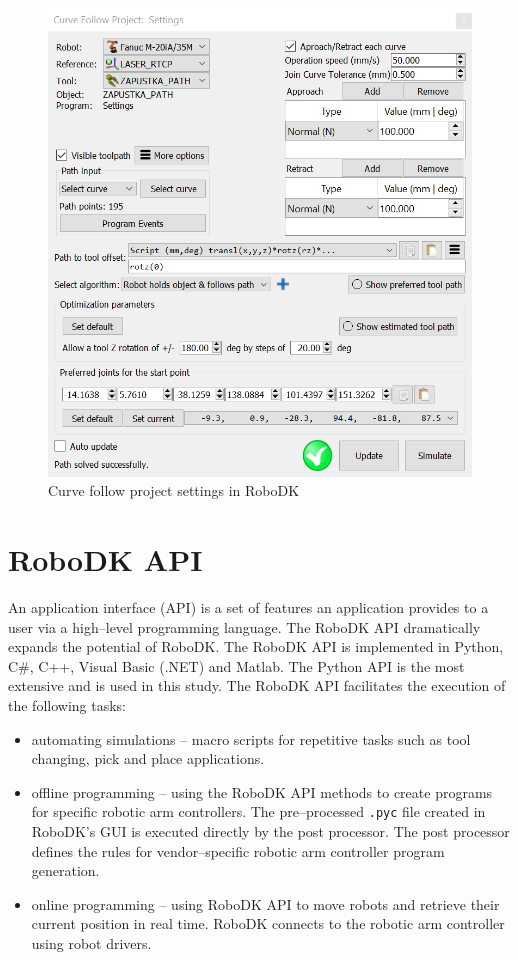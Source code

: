 \begin{figure}[h]
    \centering
    \includegraphics[width=0.9\linewidth]{img/curve_follow_settings.PNG}
    \caption{Curve follow project settings in RoboDK}
    \label{fig:curvefollow}
\end{figure}

\section{RoboDK API}

An application interface (API) is a set of features an application provides to a user via a high--level programming language. The RoboDK API dramatically expands the potential of RoboDK. The RoboDK API is implemented in Python, C\#, C++, Visual Basic (.NET) and Matlab.  The Python API is the most extensive and is used in this study. The RoboDK API facilitates the execution of the following tasks:

\begin{itemize}
    
 \item automating simulations -- macro scripts for repetitive tasks such as tool changing, pick and place applications.

 \item offline programming -- using the RoboDK API methods to create programs for specific robotic arm controllers. The pre--processed \texttt{.pyc} file created in RoboDK's GUI is executed directly by the post processor. The post processor defines the rules for vendor--specific robotic arm controller program generation. 

 \item online programming -- using RoboDK API to move robots and retrieve their current position in real time. RoboDK connects to the robotic arm controller using robot drivers.

\end{itemize}

